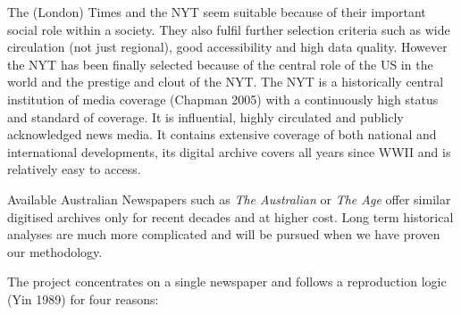 The (London) Times and the NYT seem suitable because of their important social role within a society. They also fulfil further selection criteria such as wide circulation (not just regional), good accessibility and high data quality. However the NYT has been finally selected because of the central role of the US in the world and the prestige and clout of the NYT. The NYT is a historically central institution of media coverage (Chapman 2005) with a continuously high status and standard of coverage. It is influential, highly circulated and publicly acknowledged news media. It contains extensive coverage of both national and international developments, its digital archive covers all years since WWII and is relatively easy to access.

Available Australian Newspapers such as \emph{The Australian} or \emph{The Age} offer similar digitised archives only for recent decades and at higher cost. Long term historical analyses are much more complicated and will be pursued when we have proven our methodology.


The project concentrates on a single newspaper and follows a reproduction logic (Yin 1989) for four reasons: 

